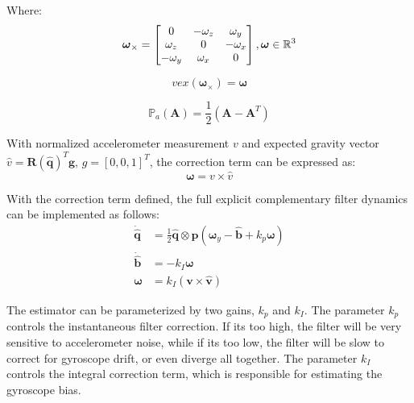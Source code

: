 Where:
 \begin{equation}
		\boldsymbol{\omega}_\times = \begin{bmatrix}
			0          & -\omega_z & \omega_y  \\
			\omega_z   & 0         & -\omega_x \\
			-\omega_y  & \omega_x  & 0	
		\end{bmatrix}, \boldsymbol{\omega} \in \mathbb{R}^3 \\ 
 \end{equation}

 \begin{equation}
	vex(\boldsymbol{\omega}_\times) = \boldsymbol{\omega}
 \end{equation}

 \begin{equation}
	\mathbb{P}_a(\boldsymbol{A}) = \frac{1}{2}(\boldsymbol{A} - \boldsymbol{A}^T)
 \end{equation}

With normalized accelerometer measurement $v$ and expected gravity vector $\hat{v} = \mathbf{R}(\mathbf{\hat{q}})^T\mathbf{g}$, $g = [0, 0, 1]^T$, the correction term can be expressed as:
\begin{equation}
	\boldsymbol{\omega} = v \times \hat{v}
\end{equation}

With the correction term defined, the full explicit complementary filter dynamics can be implemented as follows:
\begin{equation}
	\begin{aligned}
		\dot{\hat{\boldsymbol{q}}}   & = \frac{1}{2} \hat{\boldsymbol{q}} \otimes {\boldsymbol{p}}(\boldsymbol{\omega}_y - \hat{\boldsymbol{b}} + k_p \boldsymbol{\omega}) \\
		{\dot{\hat{\boldsymbol{b}}}} & = -k_I \boldsymbol{\omega}                                                      \\
		\boldsymbol{\omega}        & = k_I(\boldsymbol{v} \times \hat{\boldsymbol{v}})
	\end{aligned}
\end{equation}

The estimator can be parameterized by two gains, $k_p$ and $k_I$. The parameter $k_p$ controls the instantaneous   filter correction. If its too high, the filter will be very sensitive to accelerometer noise, while if its too low, the filter will be slow to correct for gyroscope drift, or even diverge all together. The parameter $k_I$ controls the integral correction term, which is responsible for estimating the gyroscope bias.

